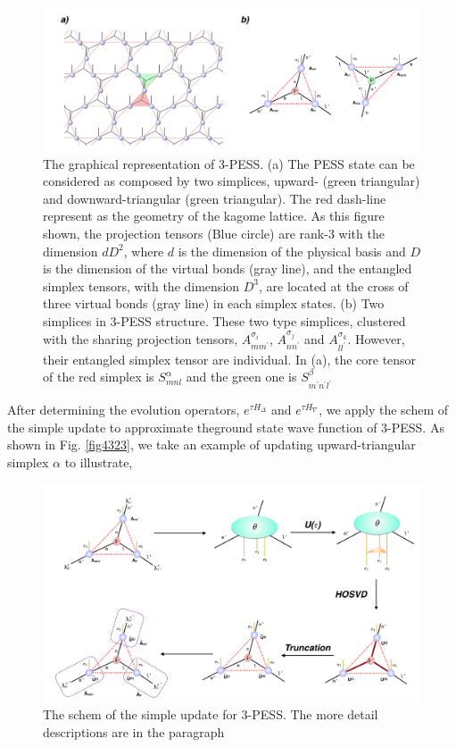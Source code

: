 \begin{figure}[ht]
	\centering
	\includegraphics[width=1.00\textwidth]{figures/fig4321.png}
	\caption[The graphical representation of 3-PESS]{The graphical representation of 3-PESS. (a) The PESS state can be considered as composed by two simplices, upward- (green triangular) and downward-triangular (green triangular). The red dash-line represent as the geometry of the kagome lattice. As this figure shown, the projection tensors (Blue circle) are rank-3 with the dimension $dD^2$, where $d$ is the dimension of the physical basis and $D$ is the dimension of the virtual bonds (gray line), and the entangled simplex tensors, with the dimension $D^3$, are located at the cross of three virtual bonds (gray line) in each simplex states. (b) Two simplices in 3-PESS structure. These two type simplices, clustered with the sharing projection tensors, $A^{\sigma_i}_{mm^{\prime}}$, $A^{\sigma_j}_{nn^{\prime}}$ and $A^{\sigma_k}_{ll^{\prime}}$. However, their entangled simplex tensor are individual. In (a), the core tensor of the red simplex is $S^{\alpha}_{mnl}$ and the green one is $S^{\beta}_{m^{\prime}n^{\prime}l^{\prime}}$}
	\label{fig4321}
\end{figure}

After determining the evolution operators, $e^{\tau H_{\Delta}}$ and $e^{\tau H_{\nabla}}$, we apply the schem of the simple update to approximate theground state wave function of 3-PESS. As shown in Fig. \ref{fig4323}, we take an example of updating upward-triangular simplex $\alpha$ to illustrate,

\begin{figure}[ht]
	\centering
	\includegraphics[width=1.00\textwidth]{figures/fig4322.png}
	\caption[The schem of the simple update for 3-PESS.]{The schem of the simple update for 3-PESS. The more detail descriptions are in the paragraph}
	\label{fig4322}
\end{figure}

